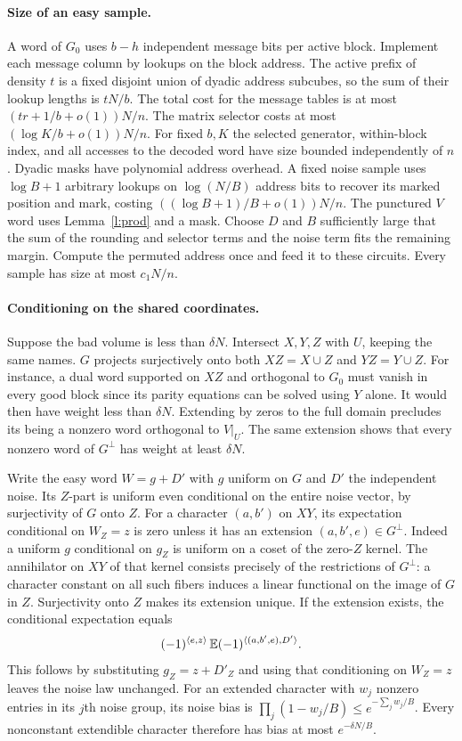 \documentclass[11pt]{article}
\begin{document}
\paragraph{Size of an easy sample.}
A word of $G_0$ uses $b-h$ independent message bits per active block. Implement each message column by lookups on the block address. The active prefix of density $t$ is a fixed disjoint union of dyadic address subcubes, so the sum of their lookup lengths is $tN/b$. The total cost for the message tables is at most $(tr+1/b+o(1))N/n$. The matrix selector costs at most $(\log K/b+o(1))N/n$. For fixed $b,K$ the selected generator, within-block index, and all accesses to the decoded word have size bounded independently of $n$. Dyadic masks have polynomial address overhead. A fixed noise sample uses $\log B+1$ arbitrary lookups on $\log(N/B)$ address bits to recover its marked position and mark, costing $((\log B+1)/B+o(1))N/n$. The punctured $V$ word uses Lemma~\ref{l:prod} and a mask. Choose $D$ and $B$ sufficiently large that the sum of the rounding and selector terms and the noise term fits the remaining margin. Compute the permuted address once and feed it to these circuits. Every sample has size at most $c_1N/n$.

\paragraph{Conditioning on the shared coordinates.}
Suppose the bad volume is less than $\delta N$. Intersect $X,Y,Z$ with $U$, keeping the same names. $G$ projects surjectively onto both $XZ=X\cup Z$ and $YZ=Y\cup Z$. For instance, a dual word supported on $XZ$ and orthogonal to $G_0$ must vanish in every good block since its parity equations can be solved using $Y$ alone. It would then have weight less than $\delta N$. Extending by zeros to the full domain precludes its being a nonzero word orthogonal to $V|_U$. The same extension shows that every nonzero word of $G^\perp$ has weight at least $\delta N$.

Write the easy word $W=g+D'$ with $g$ uniform on $G$ and $D'$ the independent noise. Its $Z$-part is uniform even conditional on the entire noise vector, by surjectivity of $G$ onto $Z$. For a character $(a,b')$ on $XY$, its expectation conditional on $W_Z=z$ is zero unless it has an extension $(a,b',e)\in G^\perp$. Indeed a uniform $g$ conditional on $g_Z$ is uniform on a coset of the zero-$Z$ kernel. The annihilator on $XY$ of that kernel consists precisely of the restrictions of $G^\perp$: a character constant on all such fibers induces a linear functional on the image of $G$ in $Z$. Surjectivity onto $Z$ makes its extension unique. If the extension exists, the conditional expectation equals
\[
 (-1)^{\langle e,z\rangle}\,\mathbb E(-1)^{\langle(a,b',e),D'\rangle}.
\]
This follows by substituting $g_Z=z+D'_Z$ and using that conditioning on $W_Z=z$ leaves the noise law unchanged. For an extended character with $w_j$ nonzero entries in its $j$th noise group, its noise bias is $\prod_j(1-w_j/B)\le e^{-\sum_jw_j/B}$. Every nonconstant extendible character therefore has bias at most $e^{-\delta N/B}$.
\end{document}
